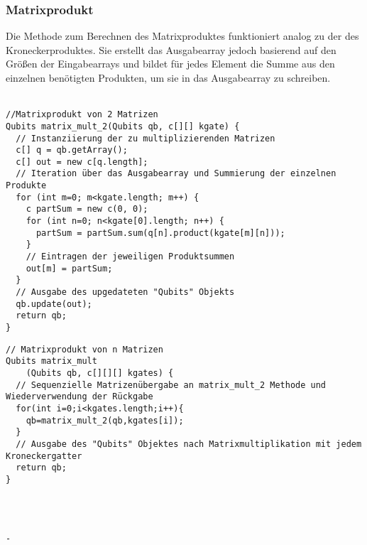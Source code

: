 \documentclass[12pt]{report}
\begin{document}
\subsubsection{Matrixprodukt}
Die Methode zum Berechnen des Matrixproduktes funktioniert analog zu der des Kroneckerproduktes.
Sie erstellt das Ausgabearray jedoch basierend auf den Größen der Eingabearrays und bildet für jedes Element die Summe aus den einzelnen benötigten Produkten, um sie in das Ausgabearray zu schreiben.\\
\vspace{-0.7cm}\\
\lstset{escapechar=@,style=customcsmall}
\noindent\begin{minipage}[t]{.60\textwidth} 
\hspace*{0pt}
\begin{lstlisting}
//Matrixprodukt von 2 Matrizen
Qubits matrix_mult_2(Qubits qb, c[][] kgate) {
  // Instanziierung der zu multiplizierenden Matrizen
  c[] q = qb.getArray();
  c[] out = new c[q.length];
  // Iteration über das Ausgabearray und Summierung der einzelnen Produkte
  for (int m=0; m<kgate.length; m++) {
    c partSum = new c(0, 0);
    for (int n=0; n<kgate[0].length; n++) {
      partSum = partSum.sum(q[n].product(kgate[m][n]));
    }
    // Eintragen der jeweiligen Produktsummen
    out[m] = partSum;
  }
  // Ausgabe des upgedateten "Qubits" Objekts
  qb.update(out);
  return qb;
}
\end{lstlisting} 
\end{minipage}
\hfill \hspace{0.2cm}
\begin{minipage}[t]{.39\textwidth} 
\hspace*{0pt}
\begin{lstlisting}
// Matrixprodukt von n Matrizen
Qubits matrix_mult
    (Qubits qb, c[][][] kgates) {
  // Sequenzielle Matrizenübergabe an matrix_mult_2 Methode und Wiederverwendung der Rückgabe
  for(int i=0;i<kgates.length;i++){
    qb=matrix_mult_2(qb,kgates[i]);
  }
  // Ausgabe des "Qubits" Objektes nach Matrixmultiplikation mit jedem Kroneckergatter
  return qb;
}



																								-
\end{lstlisting} 
\end{minipage}
\end{document}

